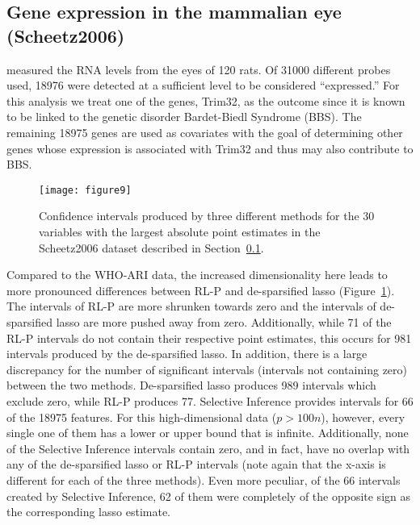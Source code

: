 \subsection{Gene expression in the mammalian eye (Scheetz2006)}\label{Sec:Scheetz2006}

\citet{Scheetz2006} measured the RNA levels from the eyes of 120 rats. Of 31000 different probes used, 18976 were detected at a sufficient level to be considered ``expressed.'' For this analysis we treat one of the genes, Trim32, as the outcome since it is known to be linked to the genetic disorder Bardet-Biedl Syndrome (BBS). The remaining 18975 genes are used as covariates with the goal of determining other genes whose expression is associated with Trim32 and thus may also contribute to BBS.

\begin{figure}[htb!]
  \begin{center}
    \texttt{[image: figure9]}
    \caption{\label{Fig:comparison_data_scheetz} Confidence intervals produced by three different methods for the 30 variables with the largest absolute point estimates in the Scheetz2006 dataset described in Section~\ref{Sec:Scheetz2006}.}
  \end{center}
\end{figure}

Compared to the WHO-ARI data, the increased dimensionality here leads to more pronounced differences between RL-P and de-sparsified lasso (Figure~\ref{Fig:comparison_data_scheetz}). The intervals of RL-P are more shrunken towards zero and the intervals of de-sparsified lasso are more pushed away from zero. Additionally, while 71 of the RL-P intervals do not contain their respective point estimates, this occurs for 981 intervals produced by the de-sparsified lasso. In addition, there is a large discrepancy for the number of significant intervals (intervals not containing zero) between the two methods. De-sparsified lasso produces 989 intervals which exclude zero, while RL-P produces 77. Selective Inference provides intervals for 66 of the 18975 features. For this high-dimensional data ($p > 100n$), however, every single one of them has a lower or upper bound that is infinite. Additionally, none of the Selective Inference intervals contain zero, and in fact, have no overlap with any of the de-sparsified lasso or RL-P intervals (note again that the x-axis is different for each of the three methods). Even more peculiar, of the 66 intervals created by Selective Inference, 62 of them were completely of the opposite sign as the corresponding lasso estimate.

